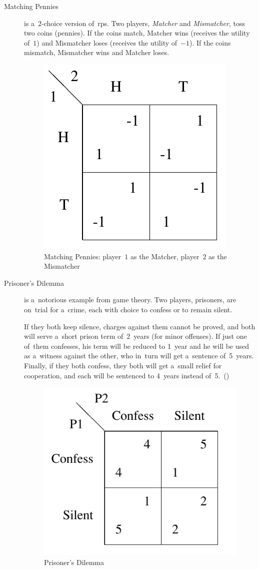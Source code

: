 \begin{description}
  \item [Matching Pennies] is a~$2$-choice version of~\acrshort{rps}.
    Two players, \emph{Matcher} and \emph{Mismatcher}, toss two coins (pennies).
    If the coins match, Matcher wins (receives the utility of~$1$) and Mismatcher loses (receives the utility of~$-1$).
    If the coins mismatch, Mismatcher wins and Matcher loses.
    \begin{figure}[H]
      \centering
      \includegraphics[width=.3\textwidth]{../img/matching-pennies.png}
      \caption[Matching Pennies]{Matching Pennies: player~$1$ as the Matcher, player~$2$ as the Mismatcher}
      \label{fig:matching-pennies}
    \end{figure}

  \item [Prisoner's Dilemma] is a~notorious example from game theory.
    Two players, prisoners, are on~trial for a~crime, each with choice to confess or to remain silent.

    If they both keep silence, charges against them cannot be proved, and both will serve a~short prison term of~2~years (for minor offenses).
    If just one of~them confesses, his term will be reduced to 1~year and he will be used as a~witness against the other, who in~turn will get a~sentence of~5~years.
    Finally, if they both confess, they both will get a~small relief for cooperation, and each will be sentenced to 4~years instead of~5.~(\cite[Section~1.1.1]{AGT07})
    \begin{figure}[H]
      \centering
      \includegraphics[width=.25\paperwidth]{../img/prisoner.png}
      \caption{Prisoner's Dilemma}
      \label{fig:prisoner}
    \end{figure}


\end{description}
